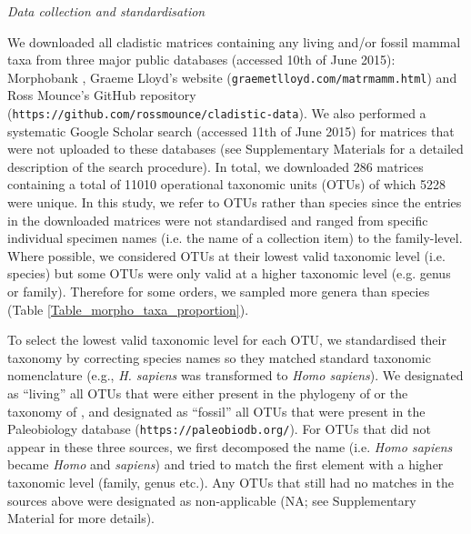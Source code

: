\documentclass[12pt,letterpaper]{article}
\renewcommand{\subsection}[1]{%
\bigskip
\begin{center}
\begin{large}
\normalfont\itshape #1
\end{large}
\end{center}}
\begin{document}
\subsection{Data collection and standardisation}
We downloaded all cladistic matrices containing any living and/or fossil mammal taxa from three major public databases (accessed 10th of June 2015): Morphobank \citep[\texttt{http://www.morphobank.org/};][]{morphobank}, Graeme Lloyd's website (\texttt{graemetlloyd.com/matrmamm.html}) and Ross Mounce's GitHub repository (\texttt{https://github.com/rossmounce/cladistic-data}).
We also performed a systematic Google Scholar search (accessed 11th of June 2015) for matrices that were not uploaded to these databases (see Supplementary Materials for a detailed description of the search procedure).
In total, we downloaded 286 matrices containing a total of 11010 operational taxonomic units (OTUs) of which 5228 were unique. %
In this study, we refer to OTUs rather than species since the entries in the downloaded matrices were not standardised and ranged from specific individual specimen names (i.e. the name of a collection item) to the family-level.
Where possible, we considered OTUs at their lowest valid taxonomic level (i.e. species) but some OTUs were only valid at a higher taxonomic level (e.g. genus or family).
Therefore for some orders, we sampled more genera than species (Table \ref{Table_morpho_taxa_proportion}).

To select the lowest valid taxonomic level for each OTU, we standardised their taxonomy by correcting species names so they matched standard taxonomic nomenclature (e.g., \textit{H. sapiens} was transformed to \textit{Homo sapiens}).
We designated as ``living'' all OTUs that were either present in the phylogeny of \citet{BinindaEmonds} or the taxonomy of \citet{wilson2005mammal}, and designated as ``fossil'' all OTUs that were present in the Paleobiology database (\texttt{https://paleobiodb.org/}).
For OTUs that did not appear in these three sources, we first decomposed the name (i.e. \textit{Homo sapiens} became \textit{Homo} and \textit{sapiens}) and tried to match the first element with a higher taxonomic level (family, genus etc.).
Any OTUs that still had no matches in the sources above were designated as non-applicable (NA; see Supplementary Material for more details).
\end{document}
